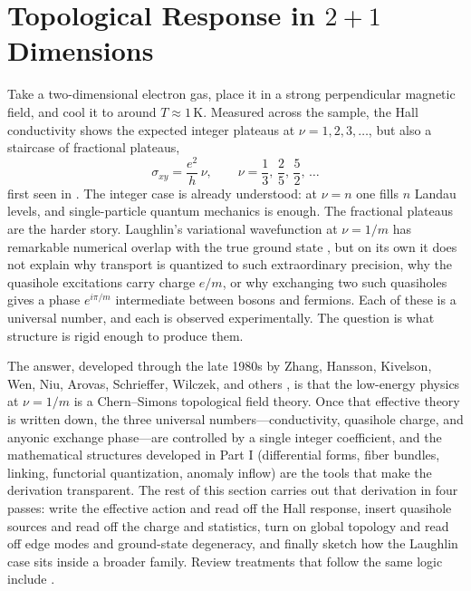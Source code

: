 \section{Topological Response in $2+1$ Dimensions}
\label{sec:response-2plus1d}

Take a two-dimensional electron gas, place it in a strong perpendicular magnetic field, and cool it to around $T\approx 1\,\text{K}$. Measured across the sample, the Hall conductivity shows the expected integer plateaus at $\nu=1,2,3,\ldots$, but also a staircase of fractional plateaus,
\begin{equation}
  \sigma_{xy}
  =
  \frac{e^2}{h}\,\nu,
  \qquad
  \nu = \frac{1}{3},\,\frac{2}{5},\,\frac{5}{2},\,\ldots
  \label{eq:fqhe-conductance}
\end{equation}
first seen in \cite{TsuiStormerGossard1982FQHEDiscovery}.
The integer case is already understood: at $\nu=n$ one fills $n$ Landau levels, and single-particle quantum mechanics is enough. The fractional plateaus are the harder story. Laughlin's variational wavefunction at $\nu=1/m$ has remarkable numerical overlap with the true ground state \cite{Laughlin1983AnomalousQHE}, but on its own it does not explain why transport is quantized to such extraordinary precision, why the quasihole excitations carry charge $e/m$, or why exchanging two such quasiholes gives a phase $e^{i\pi/m}$ intermediate between bosons and fermions. Each of these is a universal number, and each is observed experimentally. The question is what structure is rigid enough to produce them.

The answer, developed through the late 1980s by Zhang, Hansson, Kivelson, Wen, Niu, Arovas, Schrieffer, Wilczek, and others \cite{ZhangHanssonKivelson1989FQHE,ArovasSchriefferWilczek1984FractionalStatistics,Wen1990TopologicalOrders,WenNiu1990GroundStateDegeneracy}, is that the low-energy physics at $\nu=1/m$ is a Chern--Simons topological field theory. Once that effective theory is written down, the three universal numbers---conductivity, quasihole charge, and anyonic exchange phase---are controlled by a single integer coefficient, and the mathematical structures developed in Part I (differential forms, fiber bundles, linking, functorial quantization, anomaly inflow) are the tools that make the derivation transparent. The rest of this section carries out that derivation in four passes: write the effective action and read off the Hall response, insert quasihole sources and read off the charge and statistics, turn on global topology and read off edge modes and ground-state degeneracy, and finally sketch how the Laughlin case sits inside a broader family. Review treatments that follow the same logic include \cite{Wen1995TopologicalOrdersEdgeExcitations,Stern2008AnyonsQHEReview,NayakSimonSternFreedmanDasSarma2008NonabelianAnyons,HalperinSternNederRosenow2011FractionalCharge,TongQuantumHallLectures,HalperinJain2020FQHENewDevelopments}.

